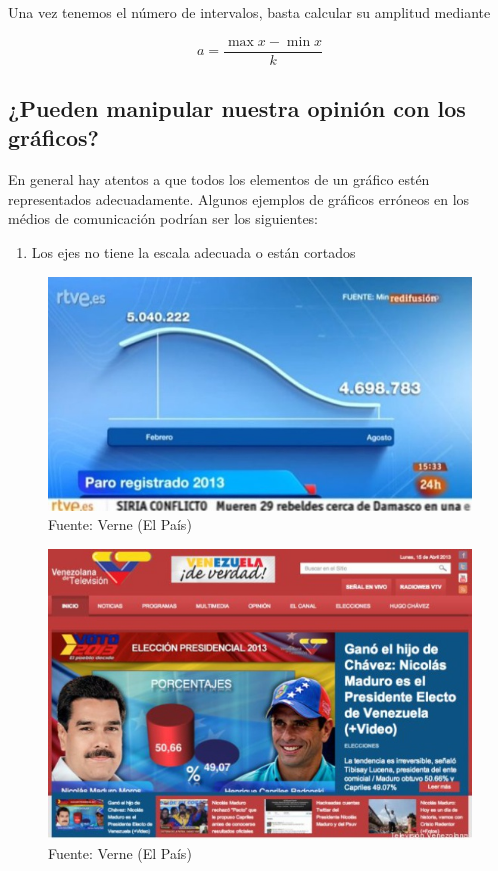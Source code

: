 \documentclass[]{book}
\providecommand{\tightlist}{%
  \setlength{\itemsep}{0pt}\setlength{\parskip}{0pt}}
\theoremstyle{definition}
\theoremstyle{definition}
\theoremstyle{definition}
\theoremstyle{remark}
\begin{document}
Una vez tenemos el número de intervalos, basta calcular su amplitud
mediante

\[ a = \frac{\max{x} - \min{x}}{k} \]

\subsection{¿Pueden manipular nuestra opinión con los
gráficos?}\label{pueden-manipular-nuestra-opinion-con-los-graficos}

En general hay atentos a que todos los elementos de un gráfico estén
representados adecuadamente. Algunos ejemplos de gráficos erróneos en
los médios de comunicación podrían ser los siguientes:

\begin{enumerate}
\def\labelenumi{\arabic{enumi}.}
\tightlist
\item
  Los ejes no tiene la escala adecuada o están cortados
\end{enumerate}

\begin{figure}
\centering
\includegraphics{images/grafico_erroneo1.jpg}
\caption{Fuente: Verne (El País)}
\end{figure}

\begin{figure}
\centering
\includegraphics{images/grafico_erroneo2.jpg}
\caption{Fuente: Verne (El País)}
\end{figure}
\end{document}
